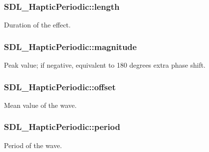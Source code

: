 \subsubsection[{\texorpdfstring{length}{length}}]{ S\+D\+L\+\_\+\+Haptic\+Periodic\+::length}\hypertarget{struct_s_d_l___haptic_periodic_a0ef0b17c54aaa5c99886c2a618444026}{}\label{struct_s_d_l___haptic_periodic_a0ef0b17c54aaa5c99886c2a618444026}
Duration of the effect. 
\subsubsection[{\texorpdfstring{magnitude}{magnitude}}]{ S\+D\+L\+\_\+\+Haptic\+Periodic\+::magnitude}\hypertarget{struct_s_d_l___haptic_periodic_aad0ad2b00c7e6959da627663d91f7b94}{}\label{struct_s_d_l___haptic_periodic_aad0ad2b00c7e6959da627663d91f7b94}
Peak value; if negative, equivalent to 180 degrees extra phase shift. 
\subsubsection[{\texorpdfstring{offset}{offset}}]{ S\+D\+L\+\_\+\+Haptic\+Periodic\+::offset}\hypertarget{struct_s_d_l___haptic_periodic_abc7aa9e9c0d546cb54189a7812fbe554}{}\label{struct_s_d_l___haptic_periodic_abc7aa9e9c0d546cb54189a7812fbe554}
Mean value of the wave. 
\subsubsection[{\texorpdfstring{period}{period}}]{ S\+D\+L\+\_\+\+Haptic\+Periodic\+::period}\hypertarget{struct_s_d_l___haptic_periodic_a0e7e105b96308129b248d52b56a2a839}{}\label{struct_s_d_l___haptic_periodic_a0e7e105b96308129b248d52b56a2a839}
Period of the wave. 
